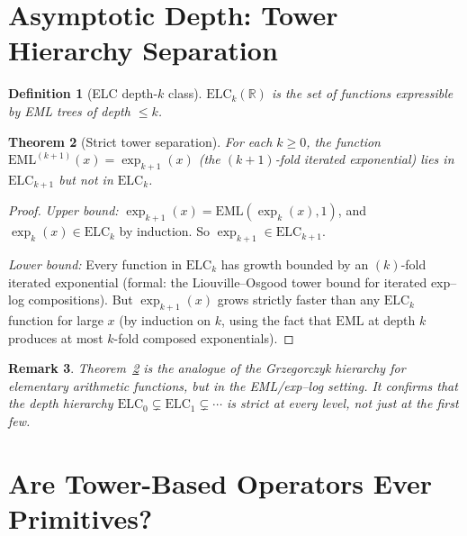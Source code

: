 \documentclass[11pt]{article}
\newtheorem{theorem}{Theorem}
\newtheorem{definition}[theorem]{Definition}
\newtheorem{remark}[theorem]{Remark}
\begin{document}
\section{Asymptotic Depth: Tower Hierarchy Separation}
\label{sec:depth}

\begin{definition}[ELC depth-$k$ class]
$\mathrm{ELC}_k(\mathbb{R})$ is the set of functions expressible by EML trees
of depth $\leq k$.
\end{definition}

\begin{theorem}[Strict tower separation]
\label{thm:tower-sep}
For each $k \geq 0$, the function $\mathrm{EML}^{(k+1)}(x) = \exp_{k+1}(x)$
(the $(k+1)$-fold iterated exponential) lies in $\mathrm{ELC}_{k+1}$ but not
in $\mathrm{ELC}_k$.
\end{theorem}

\begin{proof}
\textit{Upper bound:} $\exp_{k+1}(x) = \mathrm{EML}(\exp_k(x), 1)$,
and $\exp_k(x) \in \mathrm{ELC}_k$ by induction. So $\exp_{k+1} \in \mathrm{ELC}_{k+1}$.

\textit{Lower bound:} Every function in $\mathrm{ELC}_k$ has growth bounded by
an $(k)$-fold iterated exponential (formal: the Liouville--Osgood tower bound
for iterated exp--log compositions). But $\exp_{k+1}(x)$ grows strictly faster
than any $\mathrm{ELC}_k$ function for large $x$ (by induction on $k$, using
the fact that $\mathrm{EML}$ at depth $k$ produces at most $k$-fold composed
exponentials).
\end{proof}

\begin{remark}
Theorem~\ref{thm:tower-sep} is the analogue of the \emph{Grzegorczyk hierarchy}
for elementary arithmetic functions, but in the EML/exp--log setting.
It confirms that the depth hierarchy $\mathrm{ELC}_0 \subsetneq \mathrm{ELC}_1
\subsetneq \cdots$ is strict at \emph{every} level, not just at the first few.
\end{remark}

\section{Are Tower-Based Operators Ever Primitives?}
\label{sec:primitives}
\end{document}
